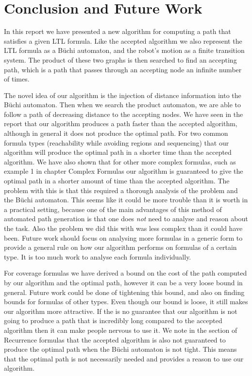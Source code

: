 \section{Conclusion and Future Work}
In this report we have presented a new algorithm for computing a path that satisfies a given LTL formula. Like the accepted algorithm we also represent the LTL formula as a B\"uchi automaton, and the robot's motion as a finite transition system. The product of these two graphs is then searched to find an accepting path, which is a path that passes through an accepting node an infinite number of times. 

The novel idea of our algorithm is the injection of distance information into the B\"uchi automaton. Then when we search the product automaton, we are able to follow a path of decreasing distance to the accepting nodes. We have seen in the report that our algorithm produces a path faster than the accepted algorithm, although in general it does not produce the optimal path. For two common formula types (reachability while avoiding regions and sequencing) that our algorithm will produce the optimal path in a shorter time than the accepted algorithm. We have also shown that for other more complex formulas, such as example 1 in chapter Complex Formulas our algorithm is guaranteed to give the optimal path in a shorter amount of time than the accepted algorithm. The problem with this is that this required a thorough analysis of the problem and the B\"uchi automaton. This seems like it could be more trouble than it is worth in a practical setting, because one of the main advantages of this method of automated path generation is that one does \textit{not} need to analyse and reason about the task. Also the problem we did this with was less complex than it could have been. Future work should focus on analysing more formulas in a generic form to provide a general rule on how our algorithm performs on formulas of a certain type. It is too much work to analyse each formula individually.    

For coverage formulas we have derived a bound on the cost of the path computed by our algorithm and the optimal path, however it can be a very loose bound in general. Future work could be done of tightening this bound, and also on finding bounds for formulas of other types. Even though our bound is loose, it still makes our algorithm more attractive. If the is no guarantee that our algorithm is not going to produce a path that is incredibly long compared to the accepted algorithm then it can make people nervous to use it. We note in the section of Recurrence formulas that the accepted algorithm is also not guaranteed to produce the optimal path when the B\"uchi automaton is not tight. This means that the optimal path is not necessarily needed and provides a reason to use our algorithm.

